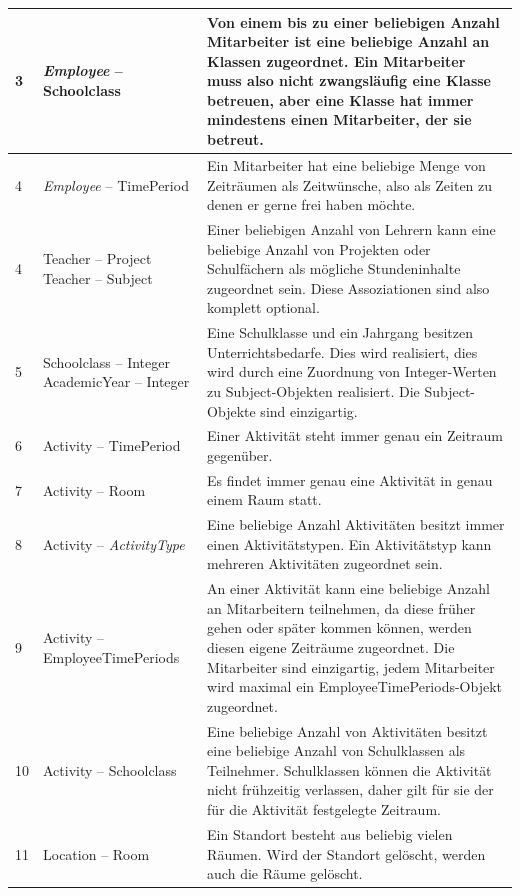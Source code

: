 \documentclass[fontsize=12pt,paper=a4,twoside]{scrartcl}
\begin{document}
\begin{tabularx}{\textwidth}{|p{0.6cm}|p{5cm}|X|}
\hline
3	& \textit{Employee} -- Schoolclass		& Von einem bis zu einer beliebigen Anzahl Mitarbeiter 
	ist eine beliebige Anzahl an Klassen zugeordnet. Ein Mitarbeiter muss also nicht zwangsläufig eine Klasse betreuen, aber eine Klasse hat immer mindestens einen Mitarbeiter, der sie betreut.\\\hline
4	& \textit{Employee} -- TimePeriod		& Ein Mitarbeiter hat eine beliebige Menge von 
	Zeiträumen als Zeitwünsche, also als Zeiten zu denen er gerne frei haben möchte. \\\hline
4	& Teacher -- Project \newline 
		  Teacher -- Subject 				& Einer beliebigen Anzahl von Lehrern kann eine beliebige Anzahl von Projekten oder Schulfächern als mögliche Stundeninhalte zugeordnet sein. Diese Assoziationen sind also komplett optional. \\\hline
5	& Schoolclass -- Integer \newline
	  AcademicYear -- Integer				& Eine Schulklasse und ein Jahrgang besitzen Unterrichtsbedarfe. Dies wird realisiert, dies wird durch eine Zuordnung von Integer-Werten zu Subject-Objekten realisiert. Die Subject-Objekte sind einzigartig. \\\hline
6	& Activity -- TimePeriod				& Einer Aktivität steht immer genau ein
	Zeitraum gegenüber.\\\hline
7	& Activity -- Room						& Es findet immer genau eine Aktivität in genau einem 
	Raum statt.\\\hline
8	& Activity -- \textit{ActivityType} 	& Eine beliebige Anzahl Aktivitäten besitzt immer
	einen Aktivitätstypen. Ein Aktivitätstyp kann mehreren Aktivitäten zugeordnet sein.\\\hline
9 	& Activity -- EmployeeTimePeriods		& An einer Aktivität kann eine beliebige Anzahl an 
	Mitarbeitern teilnehmen, da diese früher gehen oder später kommen können, werden diesen eigene Zeiträume zugeordnet. Die Mitarbeiter sind einzigartig, jedem Mitarbeiter wird maximal ein EmployeeTimePeriods-Objekt zugeordnet.\\\hline
10	& Activity -- Schoolclass				& Eine beliebige Anzahl von Aktivitäten besitzt eine
	beliebige Anzahl von Schulklassen als Teilnehmer. Schulklassen können die Aktivität nicht
	frühzeitig verlassen, daher gilt für sie der für die Aktivität festgelegte Zeitraum.\\\hline
11	& Location -- Room						& Ein Standort besteht aus beliebig vielen Räumen. 
	Wird der Standort gelöscht, werden auch die Räume gelöscht.\\\hline
\end{tabularx}\\
	
\end{document}
